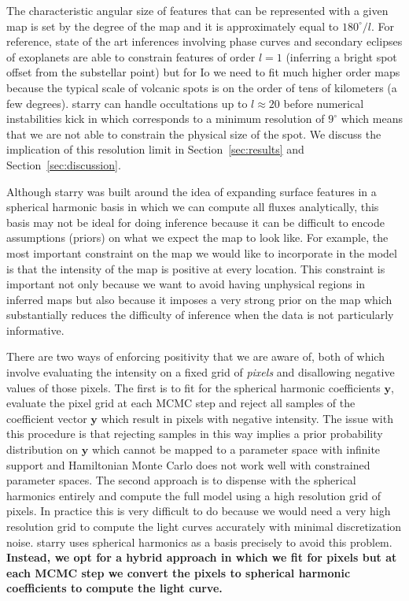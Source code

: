 \documentclass[modern]{aastex62}
\begin{document}
The characteristic angular size of features that can be represented with a given map is set by the degree of the map and it is approximately equal to $180^\circ/l$.
For reference, state of the art inferences involving phase curves and secondary eclipses of exoplanets are able to constrain features of order $l=1$ (inferring a bright spot offset from the substellar point) but for Io we need to fit much higher order maps because the typical scale of volcanic spots is on the order of tens of kilometers (a few degrees).
\textsf{starry} can handle occultations up to $l\approx 20$ before numerical instabilities kick in \citep{luger2019a} which corresponds to a minimum resolution of $9^\circ$ which means that we are not able to constrain the physical size of the spot.
We discuss the implication of this resolution limit in Section~\ref{sec:results} and Section~\ref{sec:discussion}.

Although \textsf{starry} was built around the idea of expanding surface features in a spherical harmonic basis in which we can compute all fluxes analytically, this basis may not be ideal for doing inference because it can be difficult to encode assumptions (priors) on what we expect the map to look like.
For example, the most important constraint on the map we would like to incorporate in the model is that the intensity of the map is positive at every location. 
This constraint is important not only because we want to avoid having unphysical regions in inferred maps but also because it imposes a very strong prior on the map which substantially reduces the difficulty of inference when the data is not particularly informative.

There are two ways of enforcing positivity that we are aware of, both of which involve evaluating the intensity on a fixed grid of \emph{pixels} and disallowing negative values of those pixels.
The first is to fit for the spherical harmonic coefficients $\mathbf{y}$, evaluate the pixel grid at each MCMC step and reject all samples of the coefficient vector $\mathbf{y}$ which result in pixels with negative intensity.
The issue with this procedure is that rejecting samples in this way implies a prior probability distribution on $\mathbf{y}$ which cannot be mapped to a parameter space with infinite support and Hamiltonian Monte Carlo does not work well with constrained parameter spaces.
The second approach is to dispense with the spherical harmonics entirely and compute the full model using a high resolution grid of pixels.
In practice this is very difficult to do because we would need a very high resolution grid to compute the light curves accurately with minimal discretization noise.  
\textsf{starry} uses spherical harmonics as a basis precisely to avoid this problem.
\textbf{Instead, we opt for a hybrid approach in which we fit for pixels but at each MCMC step we convert the pixels to spherical harmonic coefficients to compute the light curve.}
\end{document}
